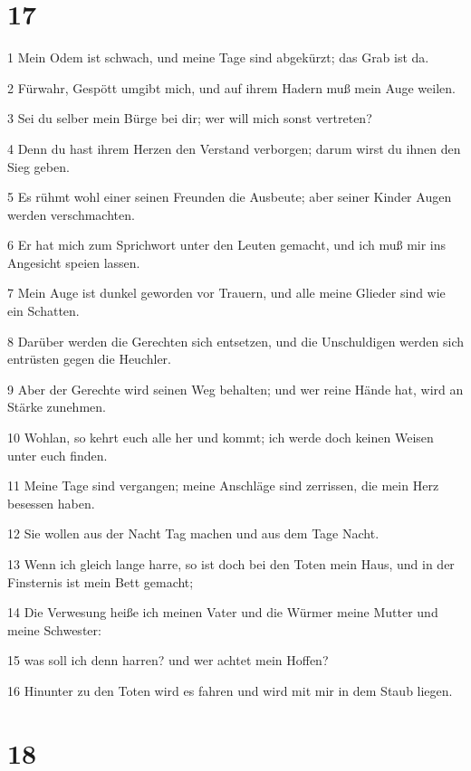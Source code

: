 \chapter{17}

\par 1 Mein Odem ist schwach, und meine Tage sind abgekürzt; das Grab ist da.
\par 2 Fürwahr, Gespött umgibt mich, und auf ihrem Hadern muß mein Auge weilen.
\par 3 Sei du selber mein Bürge bei dir; wer will mich sonst vertreten?
\par 4 Denn du hast ihrem Herzen den Verstand verborgen; darum wirst du ihnen den Sieg geben.
\par 5 Es rühmt wohl einer seinen Freunden die Ausbeute; aber seiner Kinder Augen werden verschmachten.
\par 6 Er hat mich zum Sprichwort unter den Leuten gemacht, und ich muß mir ins Angesicht speien lassen.
\par 7 Mein Auge ist dunkel geworden vor Trauern, und alle meine Glieder sind wie ein Schatten.
\par 8 Darüber werden die Gerechten sich entsetzen, und die Unschuldigen werden sich entrüsten gegen die Heuchler.
\par 9 Aber der Gerechte wird seinen Weg behalten; und wer reine Hände hat, wird an Stärke zunehmen.
\par 10 Wohlan, so kehrt euch alle her und kommt; ich werde doch keinen Weisen unter euch finden.
\par 11 Meine Tage sind vergangen; meine Anschläge sind zerrissen, die mein Herz besessen haben.
\par 12 Sie wollen aus der Nacht Tag machen und aus dem Tage Nacht.
\par 13 Wenn ich gleich lange harre, so ist doch bei den Toten mein Haus, und in der Finsternis ist mein Bett gemacht;
\par 14 Die Verwesung heiße ich meinen Vater und die Würmer meine Mutter und meine Schwester:
\par 15 was soll ich denn harren? und wer achtet mein Hoffen?
\par 16 Hinunter zu den Toten wird es fahren und wird mit mir in dem Staub liegen.

\chapter{18}

